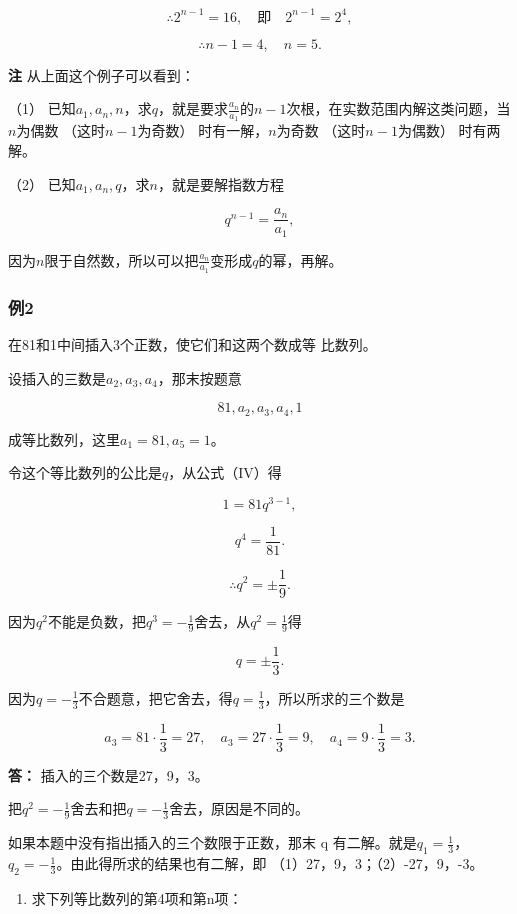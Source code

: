 \[
\therefore 2^{n - 1} = 16, \quad \text{即} \quad 2^{n - 1} = 2^{4},
\]

\[
\therefore n - 1 = 4, \quad n = 5.
\]

\textbf{注} 从上面这个例子可以看到：

（1）
已知\(a_1, a_n, n\)，求\(q\)，就是要求\(\frac{a_n}{a_1}\)的\(n-1\)次根，在实数范围内解这类问题，当\(n\)为偶数
（这时\(n-1\)为奇数） 时有一解，\(n\)为奇数 （这时\(n-1\)为偶数）
时有两解。

（2） 已知\(a_1, a_n, q\)，求\(n\)，就是要解指数方程

\[
q^{n - 1} = \frac{a_{n}}{a_{1}},
\]

因为\(n\)限于自然数，所以可以把\(\frac{a_n}{a_1}\)变形成\(q\)的幂，再解。

\subsubsection{例2}

在81和1中间插入3个正数，使它们和这两个数成等 比数列。

 设插入的三数是\(a_2, a_3, a_4\)，那末按题意

\[
81, a_{2}, a_{3}, a_{4}, 1
\]

成等比数列，这里\(a_{1}=81, a_{5}=1\)。

令这个等比数列的公比是\(q\)，从公式（IV）得

\[
1 = 81 q^{3 - 1},
\]

\[
q^{4} = \frac{1}{81}.
\]

\[
\therefore q^{2} = \pm \frac{1}{9}.
\]

因为\(q^2\)不能是负数，把\(q^3 = -\frac{1}{9}\)舍去，从\(q^2 = \frac{1}{9}\)得

\[
q = \pm \frac{1}{3}.
\]

因为\(q = -\frac{1}{3}\)不合题意，把它舍去，得\(q = \frac{1}{3}\)，所以所求的三个数是

\[
a_{3} = 81 \cdot \frac{1}{3} = 27, \quad a_{3} = 27 \cdot \frac{1}{3} = 9, \quad a_{4} = 9 \cdot \frac{1}{3} = 3.
\]

\textbf{答：} 插入的三个数是27，9，3。

把\(q^2 = -\frac{1}{9}\)舍去和把\(q = -\frac{1}{3}\)舍去，原因是不同的。

如果本题中没有指出插入的三个数限于正数，那末 q
有二解。就是\(q_{1}=\frac{1}{3}\)，\(q_{2}=-\frac{1}{3}\)。由此得所求的结果也有二解，即
（1）27，9，3；（2）-27，9，-3。

\begin{enumerate}
\item
  求下列等比数列的第4项和第n项：
\end{enumerate}

